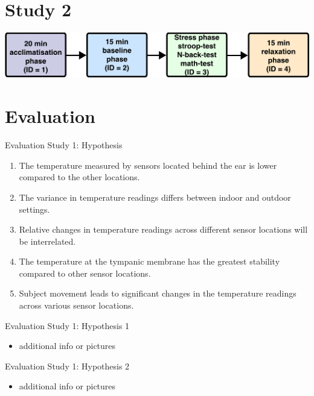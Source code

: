 \documentclass[en]{sdqbeamer}
\begin{document}
\section{Study 2}
\begin{frame}%
    \includegraphics[width=0.95\linewidth]{../thesis-doc/images/study2/Procedure2_short.pdf} %
\end{frame}

\section{Evaluation}
\begin{frame}{Evaluation Study 1: Hypothesis}
    \begin{enumerate}[label=H\arabic{*}:]
      \item The temperature measured by sensors located behind the ear is lower compared to the other locations.
      \item The variance in temperature readings differs between indoor and outdoor settings.
      \item Relative changes in temperature readings across different sensor locations will be interrelated.
      \item The temperature at the tympanic membrane has the greatest stability compared to other sensor locations.
      \item Subject movement leads to significant changes in the temperature readings across various sensor locations.
    \end{enumerate}
\end{frame}

\begin{frame}{Evaluation Study 1: Hypothesis 1}
    \begin{itemize}
        \item additional info or pictures
    \end{itemize}
\end{frame}

\begin{frame}{Evaluation Study 1: Hypothesis 2}
    \begin{itemize}
        \item additional info or pictures
    \end{itemize}
\end{frame}
\end{document}
